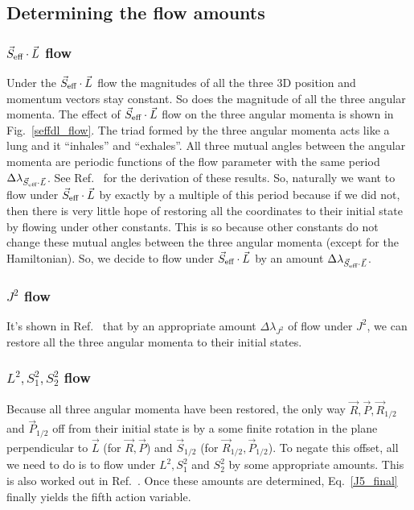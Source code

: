 \subsection{Determining the flow amounts}







\subsubsection{$\vec{S}_{\text{eff}}\cdot \vec{L}$ flow}

Under the $\vec{S}_{\text{eff}}\cdot \vec{L}$ flow the magnitudes of all the three 3D position and 
momentum vectors stay constant. So does the magnitude of all the three
angular momenta. The effect of $\vec{S}_{\text{eff}}\cdot \vec{L}$ flow on the three angular momenta 
is shown in Fig.~\ref{seffdl_flow}. The triad formed by the three
angular momenta acts like a lung and it ``inhales'' and ``exhales''.
All three mutual angles between the angular momenta are periodic functions
of the flow parameter with the same period $\Delta \lambda_{\vec{S}_{\text{eff}}\cdot \vec{L}}$.
See Ref.~\cite{tanay2021action}
for the derivation of these results. So, naturally we want to flow 
under $\vec{S}_{\text{eff}}\cdot \vec{L}$ by exactly by a multiple of this period because if we 
did not, then there is very little hope of restoring all the coordinates
to their initial state by flowing under other constants. This
is so because other constants do not change these mutual angles
between the three angular momenta (except for the Hamiltonian).
So, we decide to flow under $\vec{S}_{\text{eff}}\cdot \vec{L}$ by an amount $\Delta \lambda_{\vec{S}_{\text{eff}}\cdot \vec{L}}$.




\subsubsection{$J^2$ flow}

It's shown in Ref.~\cite{tanay2021action} that by an appropriate amount
$\Delta \lambda_{J^2}$ of flow under $J^2$, we can restore all the three angular momenta to their initial states.


\subsubsection{$L^2, S_1^2, S_2^2$ flow}

Because all three angular momenta have been restored, the only
way $\vec{R}, \vec{P}, \vec{R}_{1/2}$ and $\vec{P}_{1/2}$ off from their 
initial state is by a some finite rotation in the plane perpendicular
to $\vec{L}$ (for $\vec{R}, \vec{P}$) 
and $\vec{S}_{1/2}$ (for $\vec{R}_{1/2}, \vec{P}_{1/2}$). To negate this offset,
all we need to do is to flow under $L^2, S_1^2$ and $S_2^2$ by some
appropriate amounts. This is also worked out in Ref.~\cite{tanay2021action}.
Once these amounts are determined, Eq.~\ref{J5_final}
finally yields the fifth action variable.






